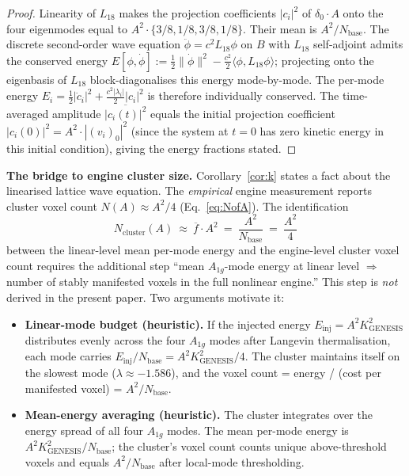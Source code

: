 \documentclass[11pt,reqno]{amsart}
\theoremstyle{plain}
\theoremstyle{definition}
\theoremstyle{remark}
\numberwithin{equation}{section}
\newcommand{\Aoneg}{A_{1g}}
\newcommand{\Nbase}{N_{\mathrm{base}}}
\newcommand{\KGen}{K_{\!\mathrm{GENESIS}}}
\begin{document}
\begin{proof}
Linearity of $L_{18}$ makes the projection coefficients $|c_{i}|^{2}$
of $\delta_{0}\cdot A$ onto the four eigenmodes equal to
$A^{2}\cdot\{3/8, 1/8, 3/8, 1/8\}$. Their mean is $A^{2}/\Nbase$.
The discrete second-order wave equation
$\ddot{\phi} = c^{2} L_{18}\phi$ on $B$ with $L_{18}$ self-adjoint
admits the conserved energy
$E[\phi, \dot\phi] := \tfrac{1}{2}\|\dot\phi\|^{2} - \tfrac{c^{2}}{2}\langle \phi, L_{18}\phi\rangle$;
projecting onto the eigenbasis of $L_{18}$ block-diagonalises this
energy mode-by-mode. The per-mode energy
$E_{i} = \tfrac{1}{2}|\dot c_{i}|^{2} + \tfrac{c^{2}|\lambda_{i}|}{2}|c_{i}|^{2}$
is therefore individually conserved. The time-averaged amplitude
$\overline{|c_{i}(t)|^{2}}$ equals the initial projection coefficient
$|c_{i}(0)|^{2} = A^{2}\cdot|(v_{i})_{0}|^{2}$ (since the system at
$t=0$ has zero kinetic energy in this initial condition), giving the
energy fractions stated.
\end{proof}

\medskip

\textbf{The bridge to engine cluster size.} Corollary~\ref{cor:k}
states a fact about the linearised lattice wave equation. The
\emph{empirical} engine measurement reports cluster voxel count
$N(A) \approx A^{2}/4$ (Eq.~\ref{eq:NofA}). The identification
\begin{equation}
\label{eq:NA}
  N_{\mathrm{cluster}}(A)\ \approx\ \overline{f}\cdot A^{2}\ =\ \frac{A^{2}}{\Nbase}\ =\ \frac{A^{2}}{4}
\end{equation}
between the linear-level mean per-mode energy and the engine-level
cluster voxel count requires the additional step ``mean
$\Aoneg$-mode energy at linear level $\Rightarrow$ number of stably
manifested voxels in the full nonlinear engine.'' This step is
\emph{not} derived in the present paper. Two arguments motivate it:

\begin{itemize}
\item \textbf{Linear-mode budget (heuristic).} If the injected energy
$E_{\mathrm{inj}} = A^{2}\KGen^{2}$ distributes evenly across the
four $\Aoneg$ modes after Langevin thermalisation, each mode carries
$E_{\mathrm{inj}}/\Nbase = A^{2}\KGen^{2}/4$. The cluster maintains
itself on the slowest mode ($\lambda \approx -1.586$), and the
voxel count = energy / (cost per manifested voxel) = $A^{2}/\Nbase$.

\item \textbf{Mean-energy averaging (heuristic).} The cluster
integrates over the energy spread of all four $\Aoneg$ modes. The
mean per-mode energy is $A^{2}\KGen^{2}/\Nbase$; the cluster's
voxel count counts unique above-threshold voxels and equals
$A^{2}/\Nbase$ after local-mode thresholding.
\end{itemize}
\end{document}
